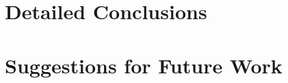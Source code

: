 \documentclass[11pt]{book}
\begin{document}
\section{Detailed Conclusions}



\section{Suggestions for Future Work}







 \markright{ }
\end{document}
